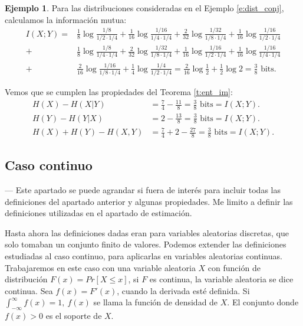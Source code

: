 \documentclass[10pt,a4paper]{article} %
\theoremstyle{definition}
\newtheorem{example}[theorem]{Ejemplo}
\begin{document}
\begin{example}
  Para las distribuciones consideradas en el Ejemplo \ref{e:dist_conj}, calculamos la información mutua:
  \begin{align*}
    I(X;Y) =& \frac{1}{8} \log \frac{1/8}{1/2 \cdot 1/4} + \frac{1}{16} \log \frac{1/16}{1/4 \cdot 1/4} + \frac{2}{32} \log \frac{1/32}{1/8 \cdot 1/4} + \frac{1}{16} \log \frac{1/16}{1/2 \cdot 1/4}\\
    +& \frac{1}{8} \log \frac{1/8}{1/4 \cdot 1/4} + \frac{2}{32} \log \frac{1/32}{1/8 \cdot 1/4} + \frac{1}{16} \log \frac{1/16}{1/2 \cdot 1/4} + \frac{1}{16} \log \frac{1/16}{1/4 \cdot 1/4}\\
    +& \frac{2}{16} \log \frac{1/16}{1/8 \cdot 1/4} + \frac{1}{4} \log \frac{1/4}{1/2 \cdot 1/4} = \frac{2}{16} \log \frac{1}{2} + \frac{1}{2} \log 2 = \frac{3}{8} \text{ bits}.
  \end{align*}

  Vemos que se cumplen las propiedades del Teorema \ref{t:ent_im}:
  \begin{align*}
    H(X) -H(X|Y) &= \frac{7}{4} - \frac{11}{8} = \frac{3}{8} \text{ bits} = I(X;Y).\\
    H(Y) -H(Y|X) &= 2 - \frac{13}{8} = \frac{3}{8} \text{ bits} = I(X;Y).\\
    H(X) + H(Y) - H(X,Y) &= \frac{7}{4} + 2 - \frac{27}{8} = \frac{3}{8} \text{ bits} = I(X;Y).
  \end{align*}
  
\end{example}

\subsection{Caso continuo}
--- Este apartado se puede agrandar si fuera de interés para incluir todas las definiciones del apartado anterior y algunas propiedades. Me limito a definir las definiciones utilizadas en el apartado de estimación.

Hasta ahora las definiciones dadas eran para variables aleatorias discretas, que solo tomaban un conjunto finito de valores. Podemos extender las definiciones estudiadas al caso continuo, para aplicarlas en variables aleatorias continuas. Trabajaremos en este caso con una variable aleatoria $X$ con función de distribución $F(x) = Pr[X \leq x]$, si $F$ es continua, la variable aleatoria se dice continua. Sea $f(x) = F'(x)$, cuando la derivada esté definida. Si $\int_{-\infty}^{\infty}f(x)=1,\ f(x)$ se llama la función de densidad de $X$. El conjunto donde $f(x) > 0$ es el soporte de $X$.
\end{document}
